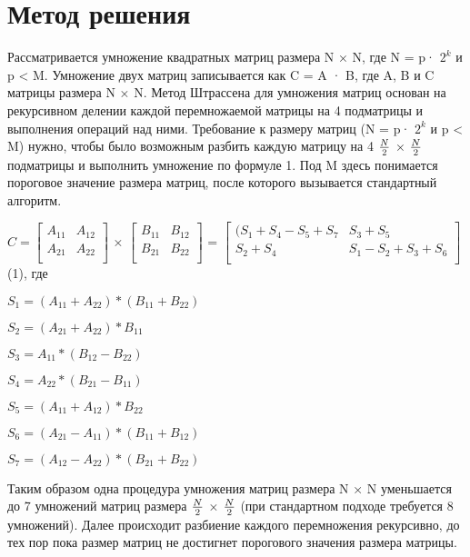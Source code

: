 \documentclass{report}
\begin{document}
\section*{Метод решения}
Рассматривается умножение квадратных матриц размера N × N, где N = p· $2^k$ и p < M. Умножение двух матриц записывается как C = A · B, где A, B и C матрицы размера N × N. Метод Штрассена для умножения матриц основан на рекурсивном делении каждой перемножаемой матрицы на 4 подматрицы и выполнения операций над ними. Требование к размеру матриц (N = p· $2^k$ и p < M) нужно, чтобы было возможным разбить каждую матрицу на 4 ${{N}\over{2}}$ × ${{N}\over{2}}$ подматрицы и выполнить умножение по формуле 1. Под M здесь понимается пороговое значение размера матриц, после которого вызывается стандартный алгоритм.
\par
$C = \left[\begin{array}{ccccc} 
A_{11} & A_{12} \\ 
A_{21} & A_{22} \\ 
\end{array}\right]$ × 
$\left[\begin{array}{ccccc} 
B_{11} & B_{12} \\ 
B_{21} & B_{22} \\  
\end{array}\right]$ =
$\left[\begin{array}{ccccc} 
(S_{1} + S_{4} - S_{5} + S_{7} & S_{3} + S_{5} \\ 
S_{2} + S_{4} & S_{1} - S_{2} + S_{3} + S_{6} \\  
\end{array}\right]$ (1), 
где
\begin{center} 
$S_1=(A_{11}+A_{22})*(B_{11}+B_{22})$

$S_2=(A_{21}+A_{22})*B_{11}$

$S_3=A_{11}*(B_{12}-B_{22})$

$S_4=A_{22}*(B_{21}-B_{11})$

$S_5=(A_{11}+A_{12})*B_{22}$

$S_6=(A_{21}-A_{11})*(B_{11}+B_{12})$

$S_7=(A_{12}-A_{22})*(B_{21}+B_{22})$
\end{center}
\par
Таким образом одна процедура умножения матриц размера N × N уменьшается до 7 умножений матриц размера ${{N}\over{2}}$ × ${{N}\over{2}}$ (при стандартном подходе требуется 8 умножений). Далее происходит разбиение каждого перемножения рекурсивно, до тех пор пока размер матриц не достигнет порогового значения размера матрицы.
\end{document}
